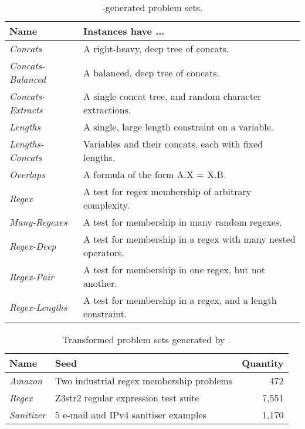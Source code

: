 \begin{table}[t]
    \centering
    \caption{\generator{}-generated problem sets.}
    \label{tbl:generated}
    \begin{tabular}{|l|l|}
        \hline
        \textbf{Name}             & \textbf{Instances have ...} \\ \hline
        \textit{Concats}          & A right-heavy, deep tree of concats. \\ \hline
        \textit{Concats-Balanced} & A balanced, deep tree of concats. \\ \hline
        \textit{Concats-Extracts} & A single concat tree, and random character extractions. \\ \hline
        \textit{Lengths}          & A single, large length constraint on a variable. \\ \hline
        \textit{Lengths-Concats}  & Variables and their concats, each with fixed lengths. \\ \hline
        \textit{Overlaps}         & A formula of the form A.X = X.B. \\ \hline
        \textit{Regex}            & A test for regex membership of arbitrary complexity. \\ \hline
        \textit{Many-Regexes}     & A test for membership in many random regexes. \\ \hline
        \textit{Regex-Deep}       & A test for membership in a regex with many nested operators. \\ \hline
        \textit{Regex-Pair}       & A test for membership in one regex, but not another. \\ \hline
        \textit{Regex-Lengths}    & A test for membership in a regex, and a length constraint. \\ \hline
    \end{tabular}
\end{table}

\begin{table}[t]
    \centering
    \caption{Transformed problem sets generated by \transformer{}.}
    \label{tbl:transformed}
    \begin{tabular}{|l|l|r|}
        \hline
        \textbf{Name}      & \textbf{Seed}                            & \textbf{Quantity} \\ \hline
        \textit{Amazon}    & Two industrial regex membership problems & 472 \\ \hline
        \textit{Regex}     & Z3str2 regular expression test suite     & 7,551 \\ \hline
        \textit{Sanitizer} & 5 e-mail and IPv4 sanitiser examples     & 1,170 \\ \hline
    \end{tabular}
\end{table}
